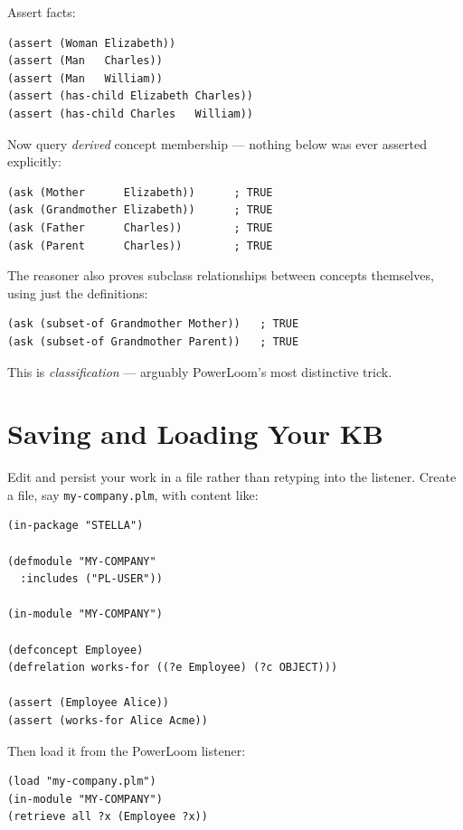 \documentclass[11pt,letterpaper]{article}
\newcommand{\file}[1]{\texttt{#1}}
\begin{document}
\noindent Assert facts:

\begin{lstlisting}
(assert (Woman Elizabeth))
(assert (Man   Charles))
(assert (Man   William))
(assert (has-child Elizabeth Charles))
(assert (has-child Charles   William))
\end{lstlisting}

\noindent Now query \emph{derived} concept membership --- nothing below was
ever asserted explicitly:

\begin{lstlisting}
(ask (Mother      Elizabeth))      ; TRUE
(ask (Grandmother Elizabeth))      ; TRUE
(ask (Father      Charles))        ; TRUE
(ask (Parent      Charles))        ; TRUE
\end{lstlisting}

\noindent The reasoner also proves subclass relationships between concepts
themselves, using just the definitions:

\begin{lstlisting}
(ask (subset-of Grandmother Mother))   ; TRUE
(ask (subset-of Grandmother Parent))   ; TRUE
\end{lstlisting}

\noindent This is \emph{classification} --- arguably PowerLoom's most
distinctive trick.

\section{Saving and Loading Your KB}
\label{sec:persist}

Edit and persist your work in a file rather than retyping into the
listener. Create a file, say \file{my-company.plm}, with content like:

\begin{lstlisting}
(in-package "STELLA")

(defmodule "MY-COMPANY"
  :includes ("PL-USER"))

(in-module "MY-COMPANY")

(defconcept Employee)
(defrelation works-for ((?e Employee) (?c OBJECT)))

(assert (Employee Alice))
(assert (works-for Alice Acme))
\end{lstlisting}

\noindent Then load it from the PowerLoom listener:

\begin{lstlisting}
(load "my-company.plm")
(in-module "MY-COMPANY")
(retrieve all ?x (Employee ?x))
\end{lstlisting}
\end{document}
